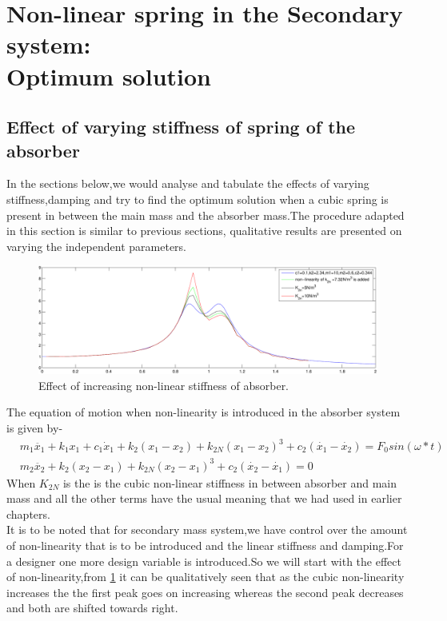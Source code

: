 \section{Non-linear spring in the Secondary system:\\ Optimum solution}
\subsection{Effect of varying stiffness of spring of the absorber }
In the sections below,we would analyse and tabulate the effects of varying stiffness,damping and try to find the optimum solution when a cubic spring is present in between the main mass and the absorber mass.The procedure adapted in this section is similar to previous sections, qualitative results are presented on varying the independent parameters.\\
\begin{figure}[h!]
\includegraphics[width=\textwidth,height=0.5\textwidth]{"figures/nonlinearity_secondary_1"}
  \caption{Effect of increasing non-linear stiffness of absorber.}
  \label{fig:non-linear secondary 1}
  \end{figure}
The equation of motion when non-linearity is introduced in the absorber system is given by-
 \begin{align}
&m_1\ddot{x_1}+k_1x_1+c_1 \dot x_1 + k_2(x_1-x_2)+k_{2N}(x_1-x_2)^3+ c_2(\dot{x_1}-\dot{x_2})=F_0sin(\omega *t) \\
&m_2\ddot{x_2}+k_2(x_2-x_1)+k_{2N}(x_2-x_1)^3+c_{2}(\dot{x_{2}}-\dot{x_{1}})=0
\end{align}
When $K_{2N}$ is the is the cubic non-linear stiffness in between absorber and main mass and all the other terms have the usual meaning that we had used in earlier chapters.\\
It is to be noted that for secondary mass system,we have control over the amount of non-linearity that is to be introduced and the linear stiffness and damping.For a designer one more design variable is introduced.So we will start with the effect of non-linearity,from \ref{fig:non-linear secondary 1} it can be qualitatively seen that as the cubic non-linearity increases the the first peak goes on increasing whereas the second peak decreases and both are shifted towards right.\\

